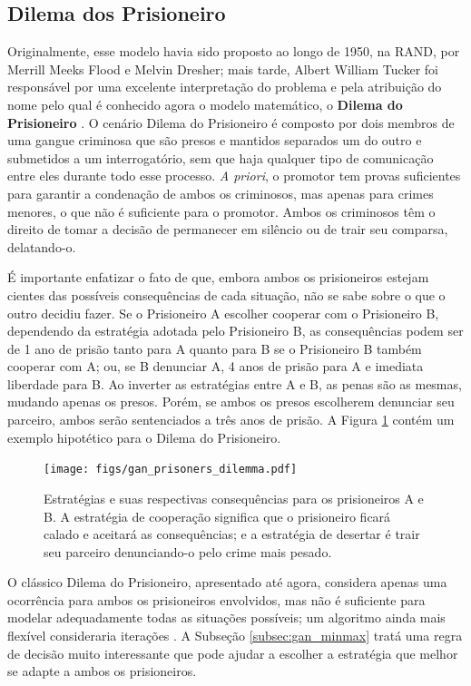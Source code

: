 \subsection{Dilema dos Prisioneiro}
\label{subsec:gan_prisoners_dilemma}

Originalmente, esse modelo havia sido proposto ao longo de 1950, na RAND, por Merrill Meeks Flood e Melvin Dresher; mais tarde, Albert William Tucker foi responsável por uma excelente interpretação do problema e pela atribuição do nome pelo qual é conhecido agora o modelo matemático, o \textbf{Dilema do Prisioneiro} \citep{poundstone1992prisoner}. O cenário Dilema do Prisioneiro é composto por dois membros de uma gangue criminosa que são presos e mantidos separados um do outro e submetidos a um interrogatório, sem que haja qualquer tipo de comunicação entre eles durante todo esse processo. \textit{A priori}, o promotor tem provas suficientes para garantir a condenação de ambos os criminosos, mas apenas para crimes menores, o que não é suficiente para o promotor. Ambos os criminosos têm o direito de tomar a decisão de permanecer em silêncio ou de trair seu comparsa, delatando-o.

É importante enfatizar o fato de que, embora ambos os prisioneiros estejam cientes das possíveis consequências de cada situação, não se sabe sobre o que o outro decidiu fazer. Se o Prisioneiro A escolher cooperar com o Prisioneiro B, dependendo da estratégia adotada pelo Prisioneiro B, as consequências podem ser de 1 ano de prisão tanto para A quanto para B se o Prisioneiro B também cooperar com A; ou, se B denunciar A, 4 anos de prisão para A e imediata liberdade para B. Ao inverter as estratégias entre A e B, as penas são as mesmas, mudando apenas os presos. Porém, se ambos os presos escolherem denunciar seu parceiro, ambos serão sentenciados a três anos de prisão. A Figura \ref{fig:prisoners_dilemma} contém um exemplo hipotético para o Dilema do Prisioneiro.

\begin{figure}[H]
    \centering
    \texttt{[image: figs/gan\_prisoners\_dilemma.pdf]}
    \caption{Estratégias e suas respectivas consequências para os prisioneiros A e B. A estratégia de cooperação significa que o prisioneiro ficará calado e aceitará as consequências; e a estratégia de desertar é trair seu parceiro denunciando-o pelo crime mais pesado.}
    \label{fig:prisoners_dilemma}
\end{figure}

O clássico Dilema do Prisioneiro, apresentado até agora, considera apenas uma ocorrência para ambos os prisioneiros envolvidos, mas não é suficiente para modelar adequadamente todas as situações possíveis; um algoritmo ainda mais flexível consideraria iterações \citep{press2012iterated}. A Subseção \ref{subsec:gan_minmax} tratá uma regra de decisão muito interessante que pode ajudar a escolher a estratégia que melhor se adapte a ambos os prisioneiros.




